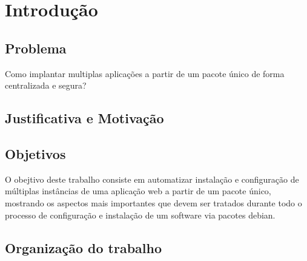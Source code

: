\chapter{Introdução}
\label{cap-introducao}

\section{Problema}
%

Como implantar multiplas aplicações a partir de um pacote único de
forma centralizada e segura?

\section{Justificativa e Motivação}


\section{Objetivos}

%

O obejtivo deste trabalho consiste em automatizar instalação e configuração de
múltiplas instâncias de uma aplicação web a partir de um pacote único, mostrando os aspectos
mais importantes que devem ser tratados durante todo o processo de configuração
e instalação de um software via pacotes debian.

%


\section{Organização do trabalho}

